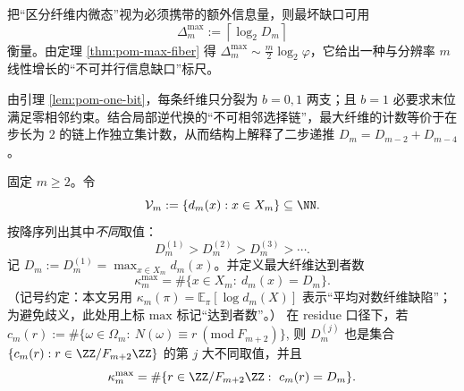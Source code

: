 \begin{remark}[最坏投影缺口的比特量化]\label{rem:pom-D-delay}
把“区分纤维内微态”视为必须携带的额外信息量，则最坏缺口可用
\[
\Delta_m^{\max}:=\left\lceil \log_2 D_m\right\rceil
\]
衡量。由定理 \ref{thm:pom-max-fiber} 得
\(
\Delta_m^{\max}\sim \frac{m}{2}\log_2\varphi
\)，它给出一种与分辨率 $m$ 线性增长的“不可并行信息缺口”标尺。
\end{remark}

\begin{remark}[一比特溢出与二步递推的结构来源]\label{rem:pom-overflow-rec}
由引理 \ref{lem:pom-one-bit}，每条纤维只分裂为 $b=0,1$ 两支；且 $b=1$ 必要求末位满足零相邻约束。结合局部逆代换的“不可相邻选择链”，最大纤维的计数等价于在步长为 $2$ 的链上作独立集计数，从而结构上解释了二步递推 $D_m=D_{m-2}+D_{m-4}$。
\end{remark}





\begin{definition}[顶层纤维谱与达到者数]\label{def:pom-top-fiber-spectrum}
固定 \(m\ge 2\)。令
\[
\mathcal{V}_m:=\{d_m(x):x\in X_m\}\subseteq \NN.
\]
按降序列出其中\emph{不同}取值：
\[
D_m^{(1)} > D_m^{(2)} > D_m^{(3)} > \cdots.
\]
记 \(D_m:=D_m^{(1)}=\max_{x\in X_m}d_m(x)\)。并定义最大纤维达到者数
\[
\kappa_m^{\mathrm{max}}
=\#\{x\in X_m:\ d_m(x)=D_m\}.
\]
（记号约定：本文另用 \(\kappa_m(\pi)=\mathbb{E}_\pi[\log d_m(X)]\) 表示“平均对数纤维缺陷”；为避免歧义，此处用上标 \(\mathrm{max}\) 标记“达到者数”。）
在 residue 口径下，若
\(
c_m(r):=\#\{\omega\in\Omega_m:\ N(\omega)\equiv r\ (\mathrm{mod}\ F_{m+2})\}
\),
则 \(D_m^{(j)}\) 也是集合 \(\{c_m(r):r\in\ZZ/F_{m+2}\ZZ\}\) 的第 \(j\) 大不同取值，并且
\[
\kappa_m^{\mathrm{max}}=\#\{r\in\ZZ/F_{m+2}\ZZ:\ c_m(r)=D_m\}.
\]
\end{definition}



